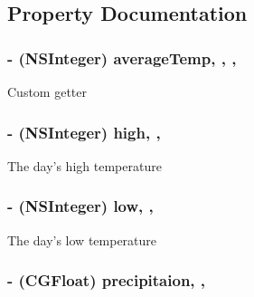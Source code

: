 \subsection{Property Documentation}
\hypertarget{interface_weather_day_aa8f6e94ecfc321ecd17870b606522050}{
\subsubsection[{average\-Temp}]{\setlength{\rightskip}{0pt plus 5cm}-\/ (N\-S\-Integer) average\-Temp\hspace{0.3cm}{\ttfamily [read]}, {\ttfamily [write]}, {\ttfamily [nonatomic]}, {\ttfamily [assign]}}}\label{interface_weather_day_aa8f6e94ecfc321ecd17870b606522050}
Custom getter \hypertarget{interface_weather_day_a97d5aad192216fe0de9ebc43296cfb68}{
\subsubsection[{high}]{\setlength{\rightskip}{0pt plus 5cm}-\/ (N\-S\-Integer) high\hspace{0.3cm}{\ttfamily [read]}, {\ttfamily [write]}, {\ttfamily [atomic]}}}\label{interface_weather_day_a97d5aad192216fe0de9ebc43296cfb68}
The day's high temperature \hypertarget{interface_weather_day_a677798c5423dabd4861214c5de4faf55}{
\subsubsection[{low}]{\setlength{\rightskip}{0pt plus 5cm}-\/ (N\-S\-Integer) low\hspace{0.3cm}{\ttfamily [read]}, {\ttfamily [write]}, {\ttfamily [atomic]}}}\label{interface_weather_day_a677798c5423dabd4861214c5de4faf55}
The day's low temperature \hypertarget{interface_weather_day_a62a56a8c78976523287185d6dce106e1}{
\subsubsection[{precipitaion}]{\setlength{\rightskip}{0pt plus 5cm}-\/ (C\-G\-Float) precipitaion\hspace{0.3cm}{\ttfamily [read]}, {\ttfamily [write]}, {\ttfamily [atomic]}}}\label{interface_weather_day_a62a56a8c78976523287185d6dce106e1}
